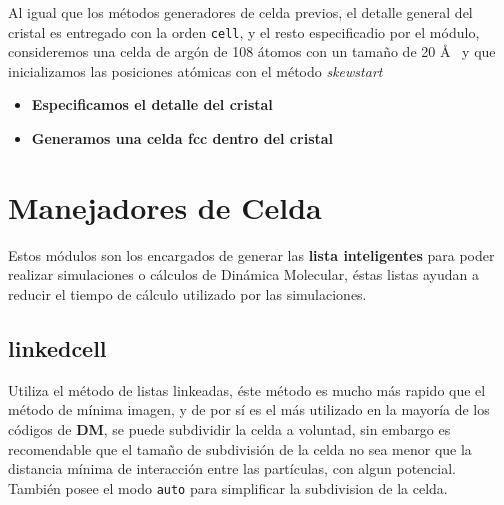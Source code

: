 
Al igual que los m\'etodos generadores de celda previos, el detalle general del cristal es entregado con la orden \verb|cell|, y el resto especificadio por el m\'odulo, consideremos una celda de arg\'on de 108 \'atomos con un tama\~no de 20 \AA~ y que inicializamos las posiciones at\'omicas con el m\'etodo \textit{skewstart}

\begin{itemize}
 \item \textbf{Especificamos el detalle del cristal}
 \item \textbf{Generamos una celda  fcc dentro del cristal}
\end{itemize}
\section{Manejadores de Celda}
Estos m\'odulos son los encargados de generar las \textbf{lista inteligentes} para poder realizar simulaciones o c\'alculos de Din\'amica Molecular, \'estas listas ayudan a reducir el tiempo de c\'alculo utilizado por las simulaciones.

\subsection{linkedcell}
Utiliza el m\'etodo de listas linkeadas, \'este m\'etodo es mucho m\'as rapido que el m\'etodo de m\'inima imagen, y de por s\'i es el m\'as utilizado en la mayor\'ia de los c\'odigos de \textbf{DM}, se puede subdividir la celda a voluntad, sin embargo es recomendable que el tama\~no de subdivisi\'on de la celda no sea menor que la distancia m\'inima de interacci\'on entre las part\'iculas, con algun potencial. Tambi\'en posee el modo \verb|auto| para simplificar la subdivision de la celda.

